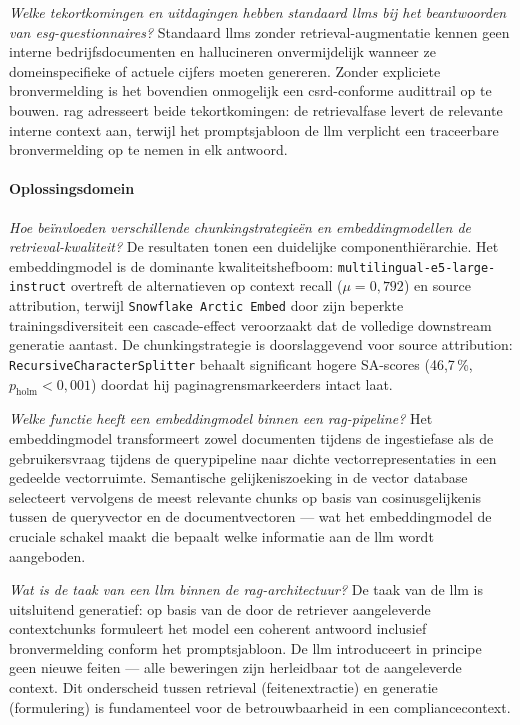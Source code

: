 \textit{Welke tekortkomingen en uitdagingen hebben standaard \glspl{llm} bij het beantwoorden van \gls{esg}-questionnaires?}
Standaard \glspl{llm} zonder retrieval-augmentatie kennen geen interne bedrijfsdocumenten en hallucineren onvermijdelijk wanneer ze domeinspecifieke of actuele cijfers moeten genereren. Zonder expliciete bronvermelding is het bovendien onmogelijk een \gls{csrd}-conforme audittrail op te bouwen. \gls{rag} adresseert beide tekortkomingen: de retrievalfase levert de relevante interne context aan, terwijl het promptsjabloon de \gls{llm} verplicht een traceerbare bronvermelding op te nemen in elk antwoord.

\paragraph{Oplossingsdomein}

\textit{Hoe beïnvloeden verschillende chunkingstrategieën en embeddingmodellen de retrieval-kwaliteit?}
De resultaten tonen een duidelijke componenthiërarchie. Het embeddingmodel is de dominante kwaliteitshefboom: \texttt{multilingual-e5-large-instruct} overtreft de alternatieven op context recall ($\mu = 0{,}792$) en source attribution, terwijl \texttt{Snowflake Arctic Embed} door zijn beperkte trainingsdiversiteit een cascade-effect veroorzaakt dat de volledige downstream generatie aantast. De chunkingstrategie is doorslaggevend voor source attribution: \texttt{RecursiveCharacterSplitter} behaalt significant hogere SA-scores (46{,}7\,\%, $p_{\text{holm}} < 0{,}001$) doordat hij paginagrensmarkeerders intact laat.

\textit{Welke functie heeft een embeddingmodel binnen een \gls{rag}-pipeline?}
Het embeddingmodel transformeert zowel documenten tijdens de ingestiefase als de gebruikersvraag tijdens de querypipeline naar dichte vectorrepresentaties in een gedeelde vectorruimte. Semantische gelijkeniszoeking in de vector database selecteert vervolgens de meest relevante chunks op basis van cosinusgelijkenis tussen de queryvector en de documentvectoren — wat het embeddingmodel de cruciale schakel maakt die bepaalt welke informatie aan de \gls{llm} wordt aangeboden.

\textit{Wat is de taak van een \gls{llm} binnen de \gls{rag}-architectuur?}
De taak van de \gls{llm} is uitsluitend generatief: op basis van de door de retriever aangeleverde contextchunks formuleert het model een coherent antwoord inclusief bronvermelding conform het promptsjabloon. De \gls{llm} introduceert in principe geen nieuwe feiten — alle beweringen zijn herleidbaar tot de aangeleverde context. Dit onderscheid tussen retrieval (feitenextractie) en generatie (formulering) is fundamenteel voor de betrouwbaarheid in een compliancecontext.

